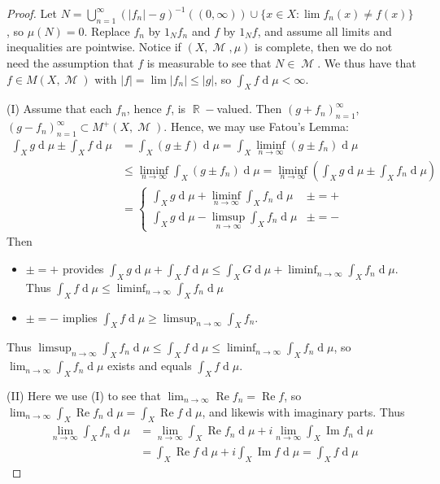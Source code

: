 \documentclass[11pt, a4paper]{memoir}
\DeclareMathOperator{\R}{{\mathbb{R}}}
\theoremstyle{change}
\theoremstyle{plain}
\theoremstyle{nonumberplain}
\newtheorem{proof}{Proof}
\DeclareMathOperator{\M}{{\mathcal{M}}}
\renewcommand{\Re}{\ensuremath{\operatorname{Re}}}
\renewcommand{\Im}{\ensuremath{\operatorname{Im}}}
\renewcommand{\d}[1]{\ensuremath{\operatorname{d}\!{#1}}}
\numberwithin{equation}{section}
\begin{document}
\begin{proof}
    Let $N=\bigcup_{n=1}^\infty(|f_n|-g)^{-1}((0,\infty))\cup\{x\in X:\lim f_n(x)\neq f(x)\}$, so $\mu(N)=0$.
    Replace $f_n$ by $1_Nf_n$ and $f$ by $1_Nf$, and assume all limits and inequalities are pointwise.
    Notice if $(X,\M,\mu)$ is complete, then we do not need the assumption that $f$ is measurable to see that $N\in\M$.
    We thus have that $f\in M(X,\M)$ with $|f|=\lim|f_n|\leq |g|$, so $\int_X f\d{\mu}<\infty$.

    (I) Assume that each $f_n$, hence $f$, is $\R-$valued.
    Then $(g+f_n)_{n=1}^\infty$, $(g-f_n)_{n=1}^\infty\subset M^+(X,\M)$.
    Hence, we may use Fatou's Lemma:
    \begin{align*}
        \int_X g\d{\mu}\pm\int_X f\d{\mu} &= \int_X(g\pm f)\d{\mu}=\int_X\liminf_{n\to\infty}(g\pm f_n)\d{\mu}\\
                                          &\leq\liminf_{n\to\infty}\int_X(g\pm f_n)\d{\mu}=\liminf_{n\to\infty}\left(\int_X g\d{\mu}\pm\int_X f_n\d{\mu}\right)\\
                                          &=
        \begin{cases}
            \int_X g\d{\mu}+\liminf_{n\to\infty}\int_X f_n\d{\mu} &\pm=+\\
            \int_X g\d{\mu}-\limsup_{n\to\infty}\int_X f_n\d{\mu} &\pm=-
        \end{cases}
    \end{align*}
    Then
    \begin{itemize}[nolistsep]
        \item $\pm=+$ provides $\int_Xg\d{\mu}+\int_X f\d{\mu}\leq\int_XG\d{\mu}+\liminf_{n\to\infty}\int_Xf_n\d{\mu}$.
            Thus $\int_Xf\d{\mu}\leq\liminf_{n\to\infty}\int_X f_n\d{\mu}$
        \item $\pm=-$ implies $\int_X f\d{\mu}\geq\limsup_{n\to\infty}\int_X f_n$.
    \end{itemize}
    Thus $\limsup_{n\to\infty}\int_Xf_n\d{\mu}\leq\int_Xf\d{\mu}\leq\liminf_{n\to\infty}\int_Xf_n\d{\mu}$, so $\lim_{n\to\infty}\int_Xf_n\d{\mu}$ exists and equals $\int_Xf\d{\mu}$.

    (II) Here we use (I) to see that $\lim_{n\to\infty}\Re f_n=\Re f$, so $\lim_{n\to\infty}\int_X\Re f_n\d{\mu}=\int_X\Re f\d{\mu}$, and likewis with imaginary parts.
    Thus
    \begin{align*}
        \lim_{n\to\infty}\int_Xf_n\d{\mu} &= \lim_{n\to\infty}\int_X\Re f_n\d{\mu}+i\lim_{n\to\infty}\int_X\Im f_n\d{\mu}\\
                                         &= \int_X\Re f\d{\mu}+i\int_X\Im f\d{\mu}=\int_X f\d{\mu}
    \end{align*}
\end{proof}
\end{document}
